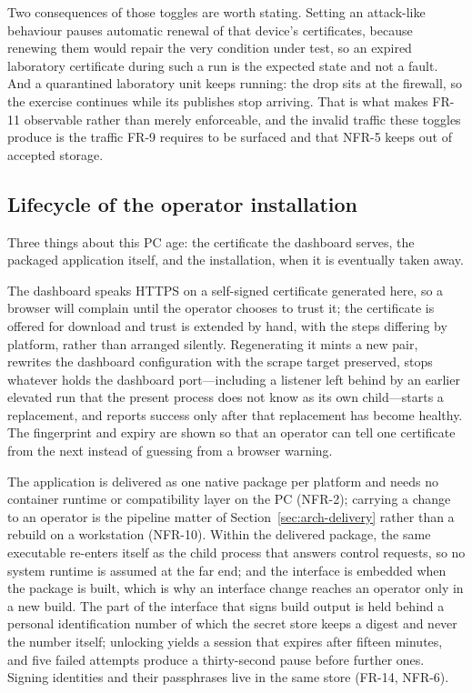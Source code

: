 \documentclass[12pt,a4paper]{report}
\begin{document}
Two consequences of those toggles are worth stating. Setting an
attack-like behaviour pauses automatic renewal of that device's
certificates, because renewing them would repair the very condition
under test, so an expired laboratory certificate during such a run is
the expected state and not a fault. And a quarantined laboratory unit
keeps running: the drop sits at the firewall, so the exercise continues
while its publishes stop arriving. That is what makes FR-11 observable
rather than merely enforceable, and the invalid traffic these toggles
produce is the traffic FR-9 requires to be surfaced and that NFR-5
keeps out of accepted storage.

\subsection{Lifecycle of the operator installation}
\label{sec:mon-lifecycle}

Three things about this PC age: the certificate the dashboard serves,
the packaged application itself, and the installation, when it is
eventually taken away.

The dashboard speaks HTTPS on a self-signed certificate generated here,
so a browser will complain until the operator chooses to trust it; the
certificate is offered for download and trust is extended by hand, with
the steps differing by platform, rather than arranged silently.
Regenerating it mints a new pair, rewrites the dashboard configuration
with the scrape target preserved, stops whatever holds the dashboard
port---including a listener left behind by an earlier elevated run that
the present process does not know as its own child---starts a
replacement, and reports success only after that replacement has become
healthy. The fingerprint and expiry are shown so that an operator can
tell one certificate from the next instead of guessing from a browser
warning.

The application is delivered as one native package per
platform and needs no container runtime or compatibility
layer on the PC (NFR-2); carrying a change to an operator is
the pipeline matter of Section~\ref{sec:arch-delivery} rather
than a rebuild on a workstation (NFR-10).
Within the delivered package, the same executable re-enters itself as
the child process that answers control requests, so no system runtime
is assumed at the far end; and the interface is embedded when the
package is built, which is why an interface change reaches an operator
only in a new build. The part of the interface that signs build output
is held behind a personal identification number of which the secret
store keeps a digest and never the number itself; unlocking yields a
session that expires after fifteen minutes, and five failed attempts
produce a thirty-second pause before further ones. Signing identities
and their passphrases live in the same store (FR-14, NFR-6).
\end{document}
